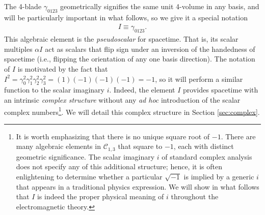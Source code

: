 \documentclass[1p,sort&compress]{elsarticle}
\numberwithin{equation}{section}
\begin{document}
The 4-blade $\gamma_{0123}$ geometrically signifies the same unit 4-volume in any basis, and will be particularly important in what follows, so we give it a special notation 
\begin{align}
  I \equiv \gamma_{0123}.
\end{align}
This algebraic element is the \emph{pseudoscalar} for spacetime.  That is, its scalar multiples $\alpha I$ act as scalars that flip sign under an inversion of the handedness of spacetime (i.e., flipping the orientation of any one basis direction).  The notation of $I$ is motivated by the fact that $I^2 = \gamma_0^2 \gamma_1^2 \gamma_2^2 \gamma_3^2 = (1)(-1)(-1)(-1) = -1$, so it will perform a similar function to the scalar imaginary $i$.  Indeed, the element $I$ provides spacetime with an intrinsic \emph{complex structure} without any \emph{ad hoc} introduction of the scalar complex numbers\footnote{It is worth emphasizing that there is no unique square root of $-1$.  There are many algebraic elements in $\mathcal{C}_{1,3}$ that square to $-1$, each with distinct geometric significance.  The scalar imaginary $i$ of standard complex analysis does not specify any of this additional structure; hence, it is often enlightening to determine whether a particular $\sqrt{-1}$ is implied by a generic $i$ that appears in a traditional physics expression.  We will show in what follows that $I$ is indeed the proper physical meaning of $i$ throughout the electromagnetic theory.}.  We will detail this complex structure in Section \ref{sec:complex}.
\end{document}
